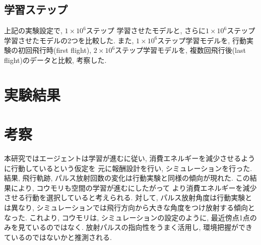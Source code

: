 \documentclass[../main]{subfiles}
\begin{document}
\subsection{学習ステップ}
上記の実験設定で, $1\times 10^6$ステップ
学習させたモデルと, さらに$1\times 10^6$ステップ
学習させたモデルの2つを比較した.
また, $1\times 10^6$ステップ学習モデルを, 
行動実験の初回飛行時(first flight), 
$2\times 10^6$ステップ学習モデルを, 
複数回飛行後(last flight)のデータと比較, 考察した.


\section{実験結果}

\section{考察}
本研究ではエージェントは学習が進むに従い, 
消費エネルギーを減少させるように行動しているという仮定を
元に報酬設計を行い, シミュレーションを行った.
結果, 飛行軌跡, パルス放射回数の変化は行動実験と同様の傾向が現れた.
この結果により,
コウモリも空間の学習が進むにしたがって
より消費エネルギーを減少させる行動を選択していると考えられる.
対して, パルス放射角度は行動実験とは異なり, 
シミュレーションでは飛行方向から大きな角度をつけ放射する傾向となった.
これより, コウモリは, シミュレーションの設定のように, 
最近傍点1点のみを見ているのではなく.
放射パルスの指向性をうまく活用し, 
環境把握ができているのではないかと推測される.
\end{document}
